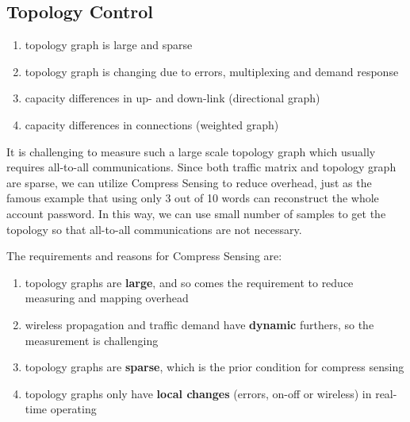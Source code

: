 \documentclass[journal,onecolumn,11pt]{IEEEtran}
\begin{document}
\subsection{Topology Control}

\begin{enumerate}
  \item topology graph is large and sparse
  \item topology graph is changing due to errors, multiplexing and demand response
  \item capacity differences in up- and down-link (directional graph)
  \item capacity differences in connections (weighted graph)
\end{enumerate}

It is challenging to measure such a large scale topology graph which usually requires all-to-all communications. Since both traffic matrix \cite{Greenberg:2009:VSF:1592568.1592576,Halperin:2011:ADC:2018436.2018442} and topology graph \cite{Chen:2010:GAA:1851182.1851190} are sparse, we can utilize Compress Sensing to reduce overhead, just as the famous example that using only 3 out of 10 words can reconstruct the whole account password. In this way, we can use small number of samples to get the topology so that all-to-all communications are not necessary.

The requirements and reasons for Compress Sensing are:
\begin{enumerate}
  \item topology graphs are \textbf{large}, and so comes the requirement to reduce measuring and mapping overhead
  \item wireless propagation and traffic demand have \textbf{dynamic} furthers, so the measurement is challenging
  \item topology graphs are \textbf{sparse}, which is the prior condition for compress sensing
  \item topology graphs only have \textbf{local changes} (errors, on-off or wireless) in real-time operating
\end{enumerate}
\end{document}
